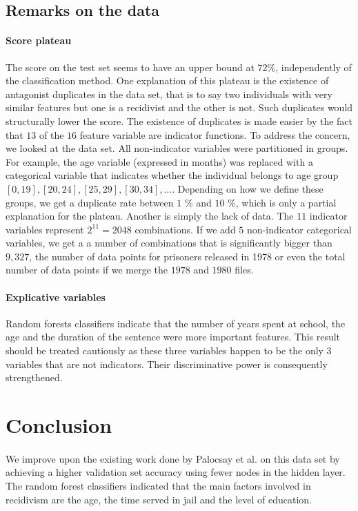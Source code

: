 \documentclass[a4paper]{article}
\theoremstyle{plain}
\begin{document}
\subsection{Remarks on the data}

\paragraph{Score plateau}
The score on the test set seems to have an upper bound at $72$\%, independently of the classification method. One explanation of this plateau is the existence of antagonist duplicates in the data set, that is to say two individuals with very similar features but one is a recidivist and the other is not. Such duplicates would structurally lower the score. The existence of duplicates is made easier by the fact that $13$ of the $16$ feature variable are indicator functions. To address the concern, we looked at the data set. All non-indicator variables were partitioned in groups. For example, the age variable (expressed in months) was replaced with a categorical variable that indicates whether the individual belongs to age group $[0,19], [20, 24], [25,29], [30,34], \dots$. Depending on how we define these groups, we get a duplicate rate between $1$ \% and $10$ \%, which is only a partial explanation for the plateau. Another is simply the lack of data. The $11$ indicator variables represent $2^11 = 2048$ combinations. If we add $5$ non-indicator categorical variables, we get a a number of combinations that is significantly bigger than $9,327$, the number of data points for prisoners released in 1978 or even the total number of data points if we merge the $1978$ and $1980$ files.

\paragraph{Explicative variables}
Random forests classifiers indicate that the number of years spent at school, the age and the duration of the sentence were more important features. This result should be treated cautiously as these three variables happen to be the only 3 variables that are not indicators. Their discriminative power is consequently strengthened.

\section*{Conclusion}

\paragraph{}
We improve upon the existing work done by Palocsay et al. \cite{bib1} on this data set by achieving a higher validation set accuracy using fewer nodes in the hidden layer. The random forest classifiers indicated that the main factors involved in recidivism are the age, the time served in jail and the level of education.
\end{document}
